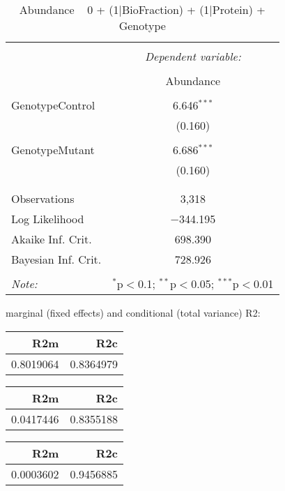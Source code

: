 \documentclass[11pt]{report}
\begin{document}
\begin{table}[!htbp] \centering 
  \caption{Abundance ~ 0 + (1|BioFraction) + (1|Protein) + Genotype} 
  \label{} 
\begin{tabular}{@{\extracolsep{5pt}}lc} 
\\[-1.8ex]\hline 
\hline \\[-1.8ex] 
 & \multicolumn{1}{c}{\textit{Dependent variable:}} \\ 
\cline{2-2} 
\\[-1.8ex] & Abundance \\ 
\hline \\[-1.8ex] 
 GenotypeControl & 6.646$^{***}$ \\ 
  & (0.160) \\ 
  & \\ 
 GenotypeMutant & 6.686$^{***}$ \\ 
  & (0.160) \\ 
  & \\ 
\hline \\[-1.8ex] 
Observations & 3,318 \\ 
Log Likelihood & $-$344.195 \\ 
Akaike Inf. Crit. & 698.390 \\ 
Bayesian Inf. Crit. & 728.926 \\ 
\hline 
\hline \\[-1.8ex] 
\textit{Note:}  & \multicolumn{1}{r}{$^{*}$p$<$0.1; $^{**}$p$<$0.05; $^{***}$p$<$0.01} \\ 
\end{tabular} 
\end{table} 
marginal (fixed effects) and conditional (total variance) R2:

\begin{tabular}{r|r}
\hline
R2m & R2c\\
\hline
0.8019064 & 0.8364979\\
\hline
\end{tabular}

\begin{tabular}{r|r}
\hline
R2m & R2c\\
\hline
0.0417446 & 0.8355188\\
\hline
\end{tabular}

\begin{tabular}{r|r}
\hline
R2m & R2c\\
\hline
0.0003602 & 0.9456885\\
\hline
\end{tabular}
\end{document}
